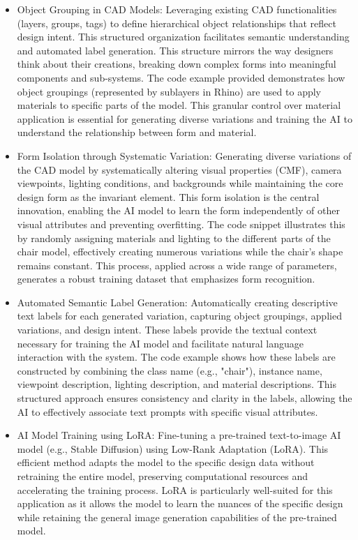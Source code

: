 \documentclass{article}
\begin{document}
\begin{itemize}
    \item Object Grouping in CAD Models: Leveraging existing CAD functionalities (layers, groups, tags) to define hierarchical object relationships that reflect design intent. This structured organization facilitates semantic understanding and automated label generation. This structure mirrors the way designers think about their creations, breaking down complex forms into meaningful components and sub-systems. The code example provided demonstrates how object groupings (represented by sublayers in Rhino) are used to apply materials to specific parts of the model. This granular control over material application is essential for generating diverse variations and training the AI to understand the relationship between form and material.

    \item Form Isolation through Systematic Variation: Generating diverse variations of the CAD model by systematically altering visual properties (CMF), camera viewpoints, lighting conditions, and backgrounds while maintaining the core design form as the invariant element. This form isolation is the central innovation, enabling the AI model to learn the form independently of other visual attributes and preventing overfitting. The code snippet illustrates this by randomly assigning materials and lighting to the different parts of the chair model, effectively creating numerous variations while the chair's shape remains constant. This process, applied across a wide range of parameters, generates a robust training dataset that emphasizes form recognition.

    \item Automated Semantic Label Generation: Automatically creating descriptive text labels for each generated variation, capturing object groupings, applied variations, and design intent. These labels provide the textual context necessary for training the AI model and facilitate natural language interaction with the system. The code example shows how these labels are constructed by combining the class name (e.g., "chair"), instance name, viewpoint description, lighting description, and material descriptions. This structured approach ensures consistency and clarity in the labels, allowing the AI to effectively associate text prompts with specific visual attributes.

    \item AI Model Training using LoRA: Fine-tuning a pre-trained text-to-image AI model (e.g., Stable Diffusion) using Low-Rank Adaptation (LoRA). This efficient method adapts the model to the specific design data without retraining the entire model, preserving computational resources and accelerating the training process. LoRA is particularly well-suited for this application as it allows the model to learn the nuances of the specific design while retaining the general image generation capabilities of the pre-trained model.


\end{itemize}
\end{document}
